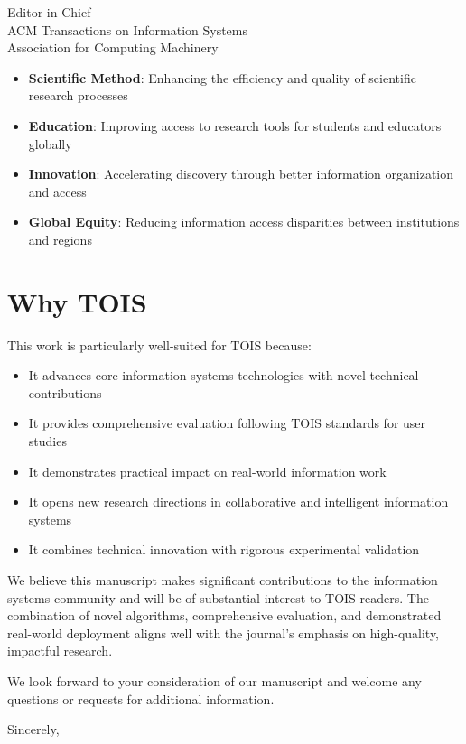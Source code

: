 \documentclass[11pt]{letter}
\begin{document}
\begin{letter}{Editor-in-Chief\\
ACM Transactions on Information Systems\\
Association for Computing Machinery}
\begin{itemize}
    \item \textbf{Scientific Method}: Enhancing the efficiency and quality of scientific research processes
    \item \textbf{Education}: Improving access to research tools for students and educators globally
    \item \textbf{Innovation}: Accelerating discovery through better information organization and access
    \item \textbf{Global Equity}: Reducing information access disparities between institutions and regions
\end{itemize}

\section*{Why TOIS}

This work is particularly well-suited for TOIS because:

\begin{itemize}
    \item It advances core information systems technologies with novel technical contributions
    \item It provides comprehensive evaluation following TOIS standards for user studies
    \item It demonstrates practical impact on real-world information work
    \item It opens new research directions in collaborative and intelligent information systems
    \item It combines technical innovation with rigorous experimental validation
\end{itemize}

We believe this manuscript makes significant contributions to the information systems community and will be of substantial interest to TOIS readers. The combination of novel algorithms, comprehensive evaluation, and demonstrated real-world deployment aligns well with the journal's emphasis on high-quality, impactful research.

We look forward to your consideration of our manuscript and welcome any questions or requests for additional information.

\closing{Sincerely,}

\end{letter}
\end{document}
